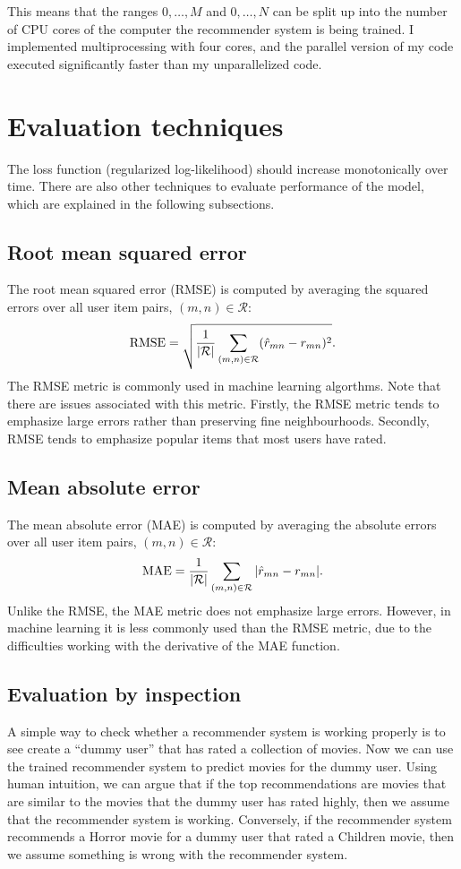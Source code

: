 \documentclass{article}
\begin{document}
This means that the ranges $0, \dots, M$ and $0, \dots, N$ can be split up into the number of CPU cores of the computer
the recommender system is being trained. I implemented multiprocessing with four cores, and the parallel
version of my code executed significantly faster than my unparallelized code.

\section{Evaluation techniques}
The loss function (regularized log-likelihood) should increase monotonically over time. There are also other techniques
to evaluate performance of the model, which are explained in the following subsections.

\subsection{Root mean squared error}
The root mean squared error (RMSE) is computed by averaging the squared errors over all user item pairs, $(m, n) \in \mathcal{R}$:
\begin{equation} \label{rmse}
    \text{RMSE} = \sqrt{\dfrac{1}{\abs{\mathcal{R}}} \sum\limits_{(m, n) \in \mathcal{R}} (\hat{r}_{mn} - {r}_{mn})^2}.
\end{equation}
The RMSE metric is commonly used in machine learning algorthms. Note that there are issues associated with this metric.
Firstly, the RMSE metric tends to emphasize large errors rather than preserving fine neighbourhoods.
Secondly, RMSE tends to emphasize popular items that most users have rated.

\subsection{Mean absolute error}
The mean absolute error (MAE) is computed by averaging the absolute errors over all user item pairs, $(m, n) \in \mathcal{R}$:
\begin{equation} \label{mae}
    \text{MAE} = \dfrac{1}{\abs{\mathcal{R}}} \sum\limits_{(m, n) \in \mathcal{R}} |\hat{r}_{mn} - {r}_{mn}|.
\end{equation}
Unlike the RMSE, the MAE metric does not emphasize large errors. 
However, in machine learning it is less commonly used than the RMSE metric, 
due to the difficulties working with the derivative of the MAE function.

\subsection{Evaluation by inspection}
A simple way to check whether a recommender system is working properly is to see create a ``dummy user'' that has rated a collection of movies.
Now we can use the trained recommender system to predict movies for the dummy user.
Using human intuition, we can argue that if the top recommendations are movies that are similar to the movies that the dummy user has rated highly,
then we assume that the recommender system is working. Conversely, if the recommender system recommends a Horror movie for a 
dummy user that rated a Children movie, then we assume something is wrong with the recommender system. 
\end{document}
